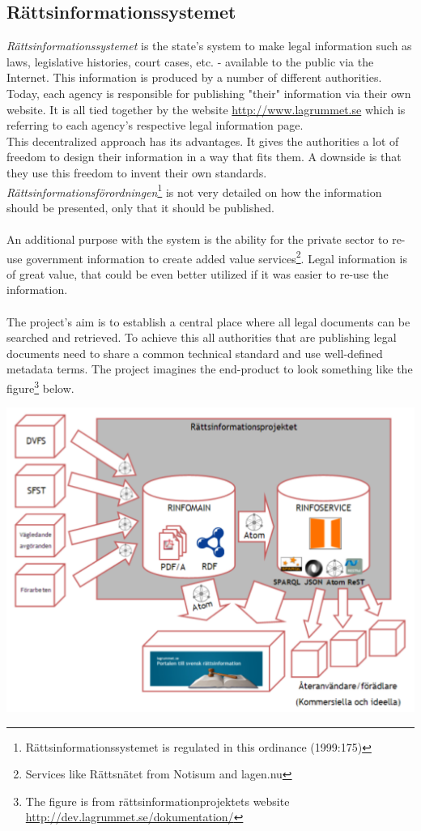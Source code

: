\subsection{Rättsinformationssystemet}
\textit{Rättsinformationssystemet} is the state's system to make legal information such as laws, legislative histories, court cases, etc. - available to the public via the Internet. This information is produced by a number of different authorities. Today, each agency is responsible for publishing "their" information via their own website. It is all tied together by the website \url{http://www.lagrummet.se} which is referring to each agency's respective legal information page.\\
This decentralized approach has its advantages. It gives the authorities a lot of freedom to design their information in a way that fits them. A downside is that they use this freedom to invent their own standards. \textit{Rättsinformationsförordningen}\footnote{Rättsinformationssystemet is regulated in this ordinance (1999:175)} is not very detailed on how the information should be presented, only that it should be published.\\\\
An additional purpose with the system is the ability for the private sector to re-use government information to create added value services\footnote{Services like Rättsnätet from Notisum and lagen.nu}. Legal information is of great value, that could be even better utilized if it was easier to re-use the information.\\\\
The project’s aim is to establish a central place where all legal documents can be searched and retrieved. To achieve this all authorities that are publishing legal documents need to share a common technical standard and use well-defined metadata terms. The project imagines  the end-product to look something like the figure\footnote{The figure is from rättsinformationprojektets website \url{http://dev.lagrummet.se/dokumentation/}} below. 
\begin{center}
\includegraphics[scale=0.6]{../imgs/rinfo.png}
\end{center}
